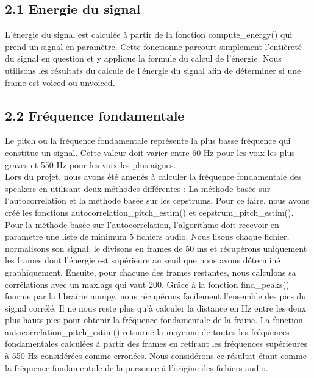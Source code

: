 \documentclass[a4paper,12pt]{report}	%
\begin{document}
{\subsection*{2.1 Energie du signal}}
L'énergie du signal est calculée à partir de la fonction compute\_energy() qui prend un signal en paramètre. Cette fonctionne parcourt simplement l'entièreté du signal en question et y applique la formule du calcul de l'énergie. Nous utilisons les résultats du calcule de l'énergie du signal afin de déterminer si une frame est voiced ou unvoiced.
{\subsection*{2.2 Fréquence fondamentale}}
Le pitch ou la fréquence fondamentale représente la plus basse fréquence qui constitue un signal. Cette valeur doit varier entre 60 Hz pour les voix les plus graves et 550 Hz pour les voix les plus aigües. \\
Lors du projet, nous avons été amenés à calculer la fréquence fondamentale des speakers en utilisant deux méthodes différentes : La méthode basée sur l'autocorrelation et la méthode basée sur les cepstrums. Pour ce faire, nous avons créé les fonctions autocorrelation\_pitch\_estim() et cepstrum\_pitch\_estim(). \\
Pour la méthode basée sur l'autocorrelation, l'algorithme doit recevoir en paramètre une liste de minimum 5 fichiers audio. Nous lisons chaque fichier, normalisons son signal, le divisons en frames de 50 ms et récupérons uniquement les frames dont l'énergie est supérieure au seuil que nous avons déterminé graphiquement. Ensuite, pour chacune des frames restantes, nous calculons sa corrélations avec un maxlags qui vaut 200. Grâce à la fonction find\_peaks() fournie par la librairie numpy, nous récupérons facilement l'ensemble des pics du signal corrélé. Il ne nous reste plus qu'à calculer la distance en Hz entre les deux plus hauts pics pour obtenir la fréquence fondamentale de la frame. La fonction autocorrelation\_pitch\_estim() retourne la moyenne de toutes les fréquences fondamentales calculées à partir des frames en retirant les fréquences supérieures à 550 Hz considérées comme erronées. Nous considérons ce résultat étant comme la fréquence fondamentale de la personne à l'origine des fichiers audio. \\
\end{document}
